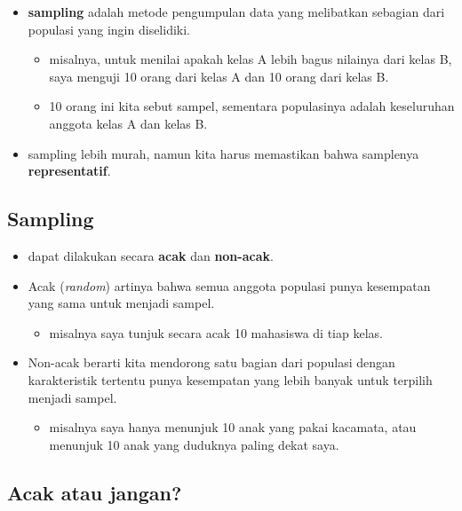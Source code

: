 \documentclass[
  letterpaper,
  DIV=11,
  numbers=noendperiod]{scrartcl}
\providecommand{\tightlist}{%
  \setlength{\itemsep}{0pt}\setlength{\parskip}{0pt}}\usepackage{longtable,booktabs,array}
\begin{document}
\begin{itemize}
\item
  \textbf{sampling} adalah metode pengumpulan data yang melibatkan
  sebagian dari populasi yang ingin diselidiki.

  \begin{itemize}
  \item
    misalnya, untuk menilai apakah kelas A lebih bagus nilainya dari
    kelas B, saya menguji 10 orang dari kelas A dan 10 orang dari kelas
    B.
  \item
    10 orang ini kita sebut sampel, sementara populasinya adalah
    keseluruhan anggota kelas A dan kelas B.
  \end{itemize}
\item
  sampling lebih murah, namun kita harus memastikan bahwa samplenya
  \textbf{representatif}.
\end{itemize}

\subsection{Sampling}\label{sampling}

\begin{itemize}
\item
  dapat dilakukan secara \textbf{acak} dan \textbf{non-acak}.
\item
  Acak (\emph{random}) artinya bahwa semua anggota populasi punya
  kesempatan yang sama untuk menjadi sampel.

  \begin{itemize}
  \tightlist
  \item
    misalnya saya tunjuk secara acak 10 mahasiswa di tiap kelas.
  \end{itemize}
\item
  Non-acak berarti kita mendorong satu bagian dari populasi dengan
  karakteristik tertentu punya kesempatan yang lebih banyak untuk
  terpilih menjadi sampel.

  \begin{itemize}
  \tightlist
  \item
    misalnya saya hanya menunjuk 10 anak yang pakai kacamata, atau
    menunjuk 10 anak yang duduknya paling dekat saya.
  \end{itemize}
\end{itemize}

\subsection{Acak atau jangan?}\label{acak-atau-jangan}
\end{document}
